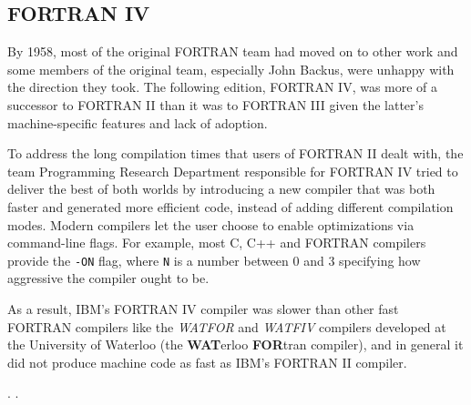\subsection{FORTRAN IV}

By 1958, most of the original FORTRAN team had moved on to other work and
some members of the original team, especially John Backus, were unhappy with
the direction they took.
The following edition, FORTRAN IV, was more of a successor to FORTRAN II than
it was to FORTRAN III given the latter's machine-specific features and
lack of adoption.

To address the long compilation times that users of FORTRAN II dealt with,
the team Programming Research Department responsible for FORTRAN IV
tried to deliver the best of both worlds by introducing a new compiler
that was both faster and generated more efficient code, instead of adding
different compilation modes. Modern compilers let the user choose to enable
optimizations via command-line flags. For example, most C, C++ and FORTRAN compilers
provide the \texttt{-ON} flag, where \texttt{N} is a number
between 0 and 3 specifying how aggressive the compiler ought to be.

As a result, IBM's FORTRAN IV compiler was slower than other fast FORTRAN compilers
like the \textit{WATFOR} and \textit{WATFIV} compilers developed at the University of Waterloo
(the \textbf{WAT}erloo \textbf{FOR}tran compiler\cite{cress_dirksen_graham_watfor_fortran_iv_1970}),
and in general it did not produce machine code as fast as IBM's FORTRAN II compiler.

.
\cite{backus_heising_fortran_1964}.
